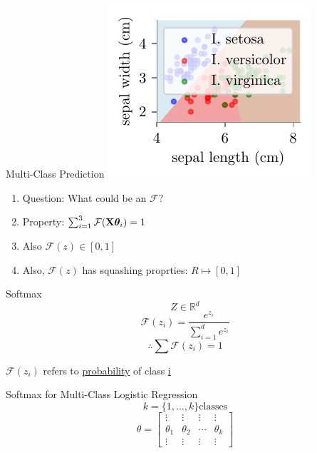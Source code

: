 \documentclass{beamer}
\begin{document}
\begin{frame}{Multi-Class Prediction}
\includegraphics[scale=0.8]{../assets/logistic-regression/figures/logisitic-iris-prediction.pdf}
\pause \begin{enumerate}
	\item Question: What could be an $\mathcal{F}?$
	\item Property: $\sum_{i=1}^{3}\mathcal{F}{({\mathbf{X}\boldsymbol{\theta}_i})} = 1$
	\item Also $\mathcal{F}(z)\in [0, 1]$
	\item Also, $\mathcal{F}(z)$ has squashing proprties: $R \mapsto [0, 1]$
\end{enumerate}


\end{frame}
\begin{frame}{Softmax}
\begin{equation*}
Z \in \mathbb{R}^{d}
\end{equation*}
\begin{equation*}
\mathcal{F}(z_{i}) = \frac{e^{z_{i}}}{\sum_{i=1}^{d}e^{z_{i}}}
\end{equation*}
\begin{equation*}
\therefore \sum \mathcal{F}(z_{i}) = 1
\end{equation*}

$\mathcal{F}(z_{i})$ refers to \underline{probability} of class \underline{i}
\end{frame}
\begin{frame}{Softmax for Multi-Class Logistic Regression}
\begin{equation*}
k = \{1, \ldots, k\} \text{classes}
\end{equation*}
$$
\theta=\left[\begin{array}{llll}
{\vdots} & {\vdots} & {\vdots} & {\vdots} \\
{\theta_{1}} & {\theta_{2}} & {\cdots} & {\theta_{k}} \\
{\vdots} & {\vdots} & {\vdots} & {\vdots} 	
\end{array}\right]
$$
\centering
{}
\end{frame}
\end{document}
